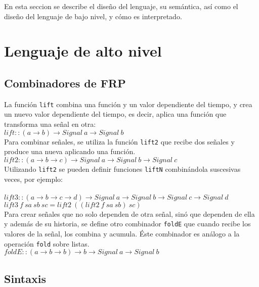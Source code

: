 En esta seccion se describe el diseño del lenguaje, su semántica,
así como el diseño del lenguaje de bajo nivel, y cómo es interpretado.

\section{Lenguaje de alto nivel}

\subsection{Combinadores de FRP}

La función \texttt{lift} combina una función y un valor
dependiente del tiempo, y crea un nuevo valor dependiente
del tiempo, es decir, aplica una función que transforma
una señal en otra:\\


$lift :: (a \rightarrow b) \rightarrow Signal\ a \rightarrow Signal\ b$\\


Para combinar señales, se utiliza la función \texttt{lift2}
que recibe dos señales y produce una nueva aplicando una
función.\\

$lift2 :: (a \rightarrow b \rightarrow c) \rightarrow Signal\ a \rightarrow Signal\ b \rightarrow Signal\ c$\\

Utilizando \texttt{lift2} se pueden definir funciones \texttt{liftN}
combinándola suscesivas veces, por ejemplo:\\
\\
$lift3 :: (a \rightarrow b \rightarrow c \rightarrow d) \rightarrow Signal\ a \rightarrow Signal\ b \rightarrow Signal\ c \rightarrow Signal\ d$\\
$lift3\ f\ sa\ sb\ sc = lift2\ ((lift2\ f\ sa\ sb)\ sc)$\\

Para crear señales que no solo dependen de otra señal, sinó que dependen
de ella y además de su historia, se define otro combinador \texttt{foldE}
que cuando recibe los valores de la señal, los combina y acumula. Éste
combinador es análogo a la operación \texttt{fold} sobre listas.\\

$foldE :: (a \rightarrow b \rightarrow b) \rightarrow b \rightarrow Signal\ a \rightarrow Signal\ b$\\

\subsection{Sintaxis}


